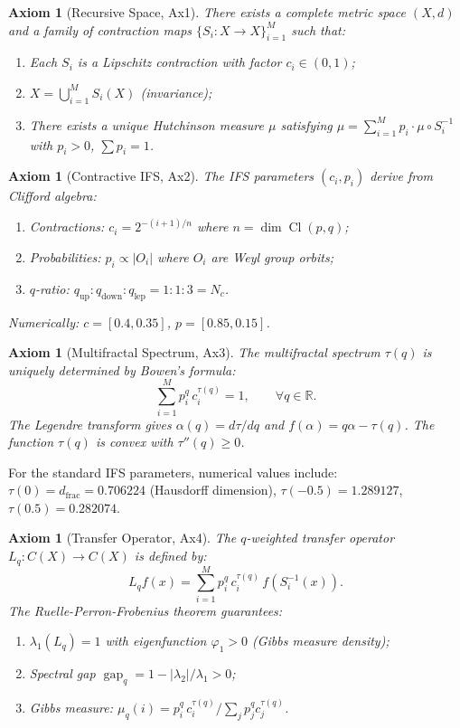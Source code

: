 \documentclass[12pt,a4paper]{article}
\newtheorem{axiom}[theorem]{Axiom}
\newcommand{\R}{\mathbb{R}}
\newcommand{\Cl}{\operatorname{Cl}}
\newcommand{\gap}{\operatorname{gap}}
\begin{document}
\begin{axiom}[Recursive Space, Ax1]
There exists a complete metric space $(X,d)$ and a family of contraction maps 
$\{S_i: X \to X\}_{i=1}^M$ such that:
\begin{enumerate}
  \item Each $S_i$ is a Lipschitz contraction with factor $c_i \in (0,1)$;
  \item $X = \bigcup_{i=1}^M S_i(X)$ (invariance);
  \item There exists a unique Hutchinson measure $\mu$ satisfying 
  $\mu = \sum_{i=1}^M p_i \cdot \mu \circ S_i^{-1}$ with $p_i > 0$, $\sum p_i = 1$.
\end{enumerate}
\end{axiom}

\begin{axiom}[Contractive IFS, Ax2]
The IFS parameters $(c_i, p_i)$ derive from Clifford algebra:
\begin{enumerate}
  \item Contractions: $c_i = 2^{-(i+1)/n}$ where $n = \dim \Cl(p,q)$;
  \item Probabilities: $p_i \propto |O_i|$ where $O_i$ are Weyl group orbits;
  \item $q$-ratio: $q_{\text{up}}:q_{\text{down}}:q_{\text{lep}} = 1:1:3 = N_c$.
\end{enumerate}
Numerically: $c = [0.4, 0.35]$, $p = [0.85, 0.15]$.
\end{axiom}

\begin{axiom}[Multifractal Spectrum, Ax3]
The multifractal spectrum $\tau(q)$ is uniquely determined by Bowen's formula:
\begin{equation}
\sum_{i=1}^M p_i^q \, c_i^{\tau(q)} = 1, \qquad \forall q \in \R.
\label{eq:bowen}
\end{equation}
The Legendre transform gives $\alpha(q) = d\tau/dq$ and $f(\alpha) = q\alpha - \tau(q)$.
The function $\tau(q)$ is convex with $\tau''(q) \ge 0$.
\end{axiom}

For the standard IFS parameters, numerical values include:
$\tau(0) = d_{\text{frac}} = 0.706224$ (Hausdorff dimension), 
$\tau(-0.5) = 1.289127$, $\tau(0.5) = 0.282074$.

\begin{axiom}[Transfer Operator, Ax4]
The $q$-weighted transfer operator $L_q: C(X) \to C(X)$ is defined by:
\begin{equation}
L_q f(x) = \sum_{i=1}^M p_i^q \, c_i^{\tau(q)} \, f(S_i^{-1}(x)).
\label{eq:transfer}
\end{equation}
The Ruelle-Perron-Frobenius theorem guarantees:
\begin{enumerate}
  \item $\lambda_1(L_q) = 1$ with eigenfunction $\varphi_1 > 0$ (Gibbs measure density);
  \item Spectral gap $\gap_q = 1 - |\lambda_2|/\lambda_1 > 0$;
  \item Gibbs measure: $\mu_q(i) = p_i^q \, c_i^{\tau(q)} / \sum_j p_j^q c_j^{\tau(q)}$.
\end{enumerate}
\end{axiom}
\end{document}
